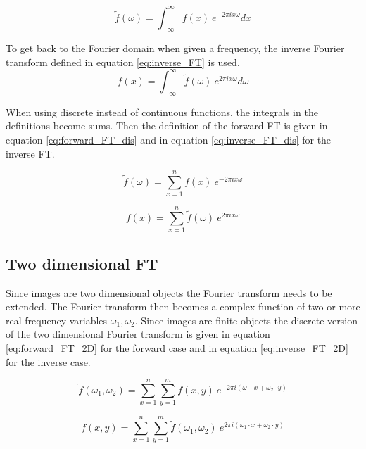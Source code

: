 \begin{equation}
	\tilde{f}(\omega) = \int_{-\infty}^{\infty} f(x)\ e^{-2\pi i x \omega}dx
	\label{eq:forward_FT}
\end{equation} 

To get back to the Fourier domain when given a frequency, the inverse Fourier transform defined in equation \ref{eq:inverse_FT} is used.  \\

\begin{equation}
	f(x) = \int_{-\infty}^{\infty} \tilde{f}(\omega)\ e^{2 \pi i x \omega}d\omega
	\label{eq:inverse_FT}
\end{equation}

When using discrete instead of continuous functions, the integrals in the definitions become sums. Then the definition of the forward FT is given in equation \ref{eq:forward_FT_dis} and in equation \ref{eq:inverse_FT_dis} for the inverse FT. 

\begin{equation}
\tilde{f}(\omega) = \sum_{x=1}^{n} f(x)\ e^{-2\pi i x \omega}
\label{eq:forward_FT_dis}
\end{equation} 

\begin{equation}
f(x) = \sum_{x=1}^{n} \tilde{f}(\omega)\ e^{2 \pi i x \omega}
\label{eq:inverse_FT_dis}
\end{equation}

\subsection{Two dimensional FT}

Since images are two dimensional objects the Fourier transform needs to be extended. The Fourier transform then becomes a complex function of two or more real frequency variables $\omega_1, \omega_2$. Since images are finite objects the discrete version of the two dimensional Fourier transform is given in equation \ref{eq:forward_FT_2D} for the forward case and in equation \ref{eq:inverse_FT_2D} for the inverse case.

\begin{equation}
	\tilde{f}(\omega_1, \omega_2) = \sum_{x=1}^{n} \sum_{y=1}^{m} f(x,y)\ e^{-2\pi i (\omega_1 \cdot x + \omega_2 \cdot y)}
\label{eq:forward_FT_2D}
\end{equation}

\begin{equation}
f(x, y) = \sum_{x=1}^{n} \sum_{y=1}^{m} \tilde{f}(\omega_1, \omega_2)\ e^{2\pi i (\omega_1 \cdot x + \omega_2 \cdot y)}
\label{eq:inverse_FT_2D}
\end{equation}

